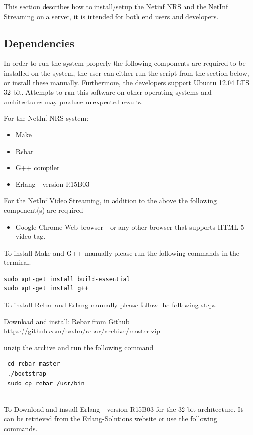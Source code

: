 This section describes how to install/setup the Netinf NRS and the NetInf Streaming on a server, it is intended for both end users and developers.


\subsection{Dependencies}

In order to run the system properly the following components are required to be installed on the system, the user can either run the script from the section below, or install these manually. Furthermore, the developers support Ubuntu 12.04 LTS 32 bit. Attempts to run this software on other operating systems and architectures may produce unexpected results.


For the NetInf NRS system:
\begin{itemize}
\item Make
\item Rebar
\item G++ compiler
\item Erlang - version R15B03
\end{itemize}

For the NetInf Video Streaming, in addition to the above the following component(s) are required
\begin{itemize}
\item Google Chrome Web browser - or any other browser that supports HTML 5 video tag.
\end{itemize}

To install Make and G++ manually please run the following commands in the terminal.
\begin{verbatim}
sudo apt-get install build-essential
sudo apt-get install g++
\end{verbatim}

To install Rebar and Erlang manually please follow the following steps

Download and install: Rebar from Github
https://github.com/basho/rebar/archive/master.zip

unzip the archive and run the following command
\begin{verbatim}
 cd rebar-master
 ./bootstrap
 sudo cp rebar /usr/bin
 
\end{verbatim}

To Download and install Erlang - version R15B03 for the 32 bit architecture.
It can be retrieved from the Erlang-Solutions website or use the following commands.

